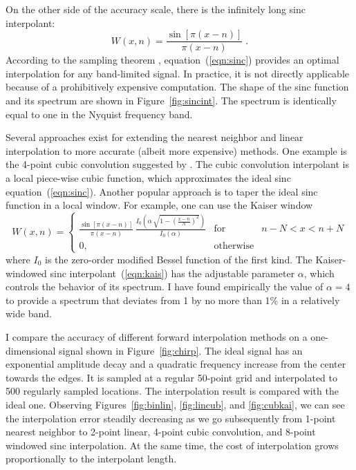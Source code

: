 \par
On the other side of the accuracy scale, there is the infinitely long
sinc interpolant:
\begin{equation}\label{eqn:sinc}
  W (x, n) = \frac{\sin \left[\pi (x - n) \right]}{\pi (x - n)} \;.
\end{equation}
According to the sampling theorem \cite[]{kotelnikov,shannon},
equation~(\ref{eqn:sinc}) provides an optimal interpolation for any
band-limited signal. In practice, it is not directly applicable
because of a prohibitively expensive computation. The shape of the sinc
function and its spectrum are shown in Figure~\ref{fig:sincint}. The
spectrum is identically equal to one in the Nyquist frequency band.

\par
Several approaches exist for extending the nearest neighbor and linear
interpolation to more accurate (albeit more expensive) methods. One
example is the 4-point cubic convolution suggested by \cite{keys}.
The cubic convolution interpolant is a local piece-wise cubic
function, which approximates the ideal sinc equation~(\ref{eqn:sinc}).
Another popular approach is to taper the ideal sinc function in a
local window. For example, one can use the Kaiser window \cite[]{kaiser}
\begin{equation}
  \label{eqn:kais}
  W (x, n) = \left\{\begin{array}{lcr} \displaystyle
      \frac{\sin \left[\pi (x - n) \right]}{\pi (x - n)}\,
      \frac{I_0\left(\alpha\,\sqrt{1-\left(\frac{x-n}{N}\right)^2}\right)}
      {I_0(\alpha)} & \mbox{for} & n - N < x < n + N \\
      0, & \mbox{otherwise} &
\end{array}\right.
\end{equation}
where $I_0$ is the zero-order modified Bessel function of the first
kind.  The Kaiser-windowed sinc interpolant~(\ref{eqn:kais}) has the
adjustable parameter $\alpha$, which controls the behavior of its
spectrum. I have found empirically the value of $\alpha=4$ to provide
a spectrum that deviates from 1 by no more than 1\% in a relatively
wide band.
\par
I compare the accuracy of different forward interpolation methods on a
one-dimensional signal shown in Figure~\ref{fig:chirp}. The ideal
signal has an exponential amplitude decay and a quadratic frequency
increase from the center towards the edges. It is sampled at a regular
50-point grid and interpolated to 500 regularly sampled locations. The
interpolation result is compared with the ideal one. Observing
Figures~\ref{fig:binlin}, \ref{fig:lincub}, and \ref{fig:cubkai}, we
can see the interpolation error steadily decreasing as we go
subsequently from 1-point nearest neighbor to 2-point linear, 4-point
cubic convolution, and 8-point windowed sinc interpolation. At the
same time, the cost of interpolation grows proportionally to the
interpolant length.


